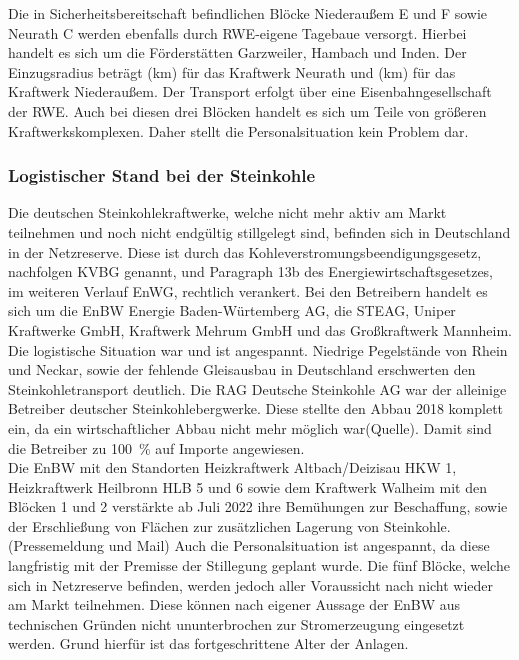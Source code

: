		Die in Sicherheitsbereitschaft befindlichen Blöcke Niederaußem E und F sowie Neurath C werden ebenfalls durch RWE-eigene Tagebaue versorgt. Hierbei handelt es sich um die Förderstätten Garzweiler, Hambach und Inden. Der Einzugsradius beträgt (km) für das Kraftwerk Neurath und (km) für das Kraftwerk Niederaußem. Der Transport erfolgt über eine Eisenbahngesellschaft der RWE. Auch bei diesen drei Blöcken handelt es sich um Teile von größeren Kraftwerkskomplexen. Daher stellt die Personalsituation kein Problem dar.
		
		\subsubsection{Logistischer Stand bei der Steinkohle} \label{sect: Steinkohle}
		Die deutschen Steinkohlekraftwerke, welche nicht mehr aktiv am Markt teilnehmen und noch nicht endgültig stillgelegt sind, befinden sich in Deutschland in der Netzreserve. Diese ist durch das Kohleverstromungsbeendigungsgesetz, nachfolgen KVBG genannt, und Paragraph 13b des Energiewirtschaftsgesetzes, im weiteren Verlauf EnWG, rechtlich verankert. Bei den Betreibern handelt es sich um die EnBW Energie Baden-Würtemberg AG, die STEAG, Uniper Kraftwerke GmbH, Kraftwerk Mehrum GmbH und das Großkraftwerk Mannheim. \\
		
		Die logistische Situation war und ist angespannt. Niedrige Pegelstände von Rhein und Neckar, sowie der fehlende Gleisausbau in Deutschland erschwerten den Steinkohletransport deutlich. Die RAG Deutsche Steinkohle AG war der alleinige Betreiber deutscher Steinkohlebergwerke. Diese stellte den Abbau 2018 komplett ein, da ein wirtschaftlicher Abbau nicht mehr möglich war(Quelle). Damit sind die Betreiber zu \SI{100}{\percent} auf Importe angewiesen.\\
		
		Die EnBW mit den Standorten Heizkraftwerk Altbach/Deizisau HKW 1, Heizkraftwerk Heilbronn HLB 5 und 6 sowie dem Kraftwerk Walheim mit den Blöcken 1 und 2 verstärkte ab Juli 2022 ihre Bemühungen zur Beschaffung, sowie der Erschließung von Flächen zur zusätzlichen Lagerung von Steinkohle.(Pressemeldung und Mail) Auch die Personalsituation ist angespannt, da diese langfristig mit der Premisse der Stillegung geplant wurde. Die fünf Blöcke, welche sich in Netzreserve befinden, werden jedoch aller Voraussicht nach nicht wieder am Markt teilnehmen. Diese können nach eigener Aussage der EnBW aus technischen Gründen nicht ununterbrochen zur Stromerzeugung eingesetzt werden. Grund hierfür ist das fortgeschrittene Alter der Anlagen.\\
		
